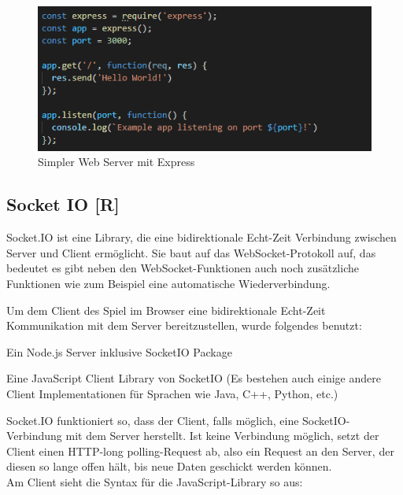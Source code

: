 \begin{figure}[H]
    \centering
    \includegraphics[scale=1]{pics/Express.PNG}
    \caption{Simpler Web Server mit Express}
\end{figure}

\subsection{Socket IO [R]}

Socket.IO ist eine Library, die eine bidirektionale Echt-Zeit Verbindung zwischen Server und Client ermöglicht. Sie baut auf das WebSocket-Protokoll auf, das bedeutet es gibt neben den WebSocket-Funktionen auch noch zusätzliche Funktionen wie zum Beispiel eine automatische Wiederverbindung.

Um dem Client des Spiel im Browser eine bidirektionale Echt-Zeit Kommunikation mit dem Server bereitzustellen, wurde folgendes benutzt:
\begin{compactitem}
    \item Ein Node.js Server inklusive SocketIO Package
    \item Eine JavaScript Client Library von SocketIO (Es bestehen auch einige andere Client Implementationen für Sprachen wie Java, C++, Python, etc.)
\end{compactitem}

Socket.IO funktioniert so, dass der Client, falls möglich, eine SocketIO-Verbindung mit dem Server herstellt.
Ist keine Verbindung möglich, setzt der Client einen HTTP-long polling-Request ab, also ein Request an den Server, der diesen so lange offen hält, bis neue Daten geschickt werden können. \cite{httpLongPolling} \\
Am Client sieht die Syntax für die JavaScript-Library so aus:


